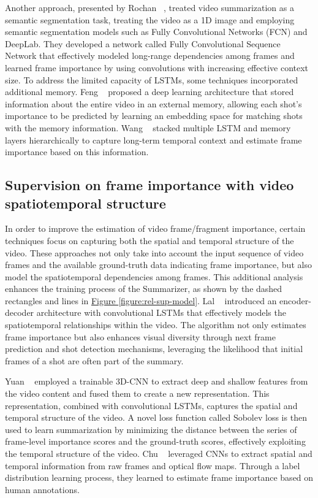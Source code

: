 		Another approach, presented by Rochan \etal~\cite{rochan2018sequence}, treated video summarization as a semantic segmentation task, treating the video as a 1D image and employing semantic segmentation models such as Fully Convolutional Networks (FCN) and DeepLab. They developed a network called Fully Convolutional Sequence Network that effectively modeled long-range dependencies among frames and learned frame importance by using convolutions with increasing effective context size. To address the limited capacity of LSTMs, some techniques incorporated additional memory. Feng \etal~\cite{feng2018memory} proposed a deep learning architecture that stored information about the entire video in an external memory, allowing each shot's importance to be predicted by learning an embedding space for matching shots with the memory information. Wang \etal~\cite{wang2019stacked} stacked multiple LSTM and memory layers hierarchically to capture long-term temporal context and estimate frame importance based on this information.


	\subsection{Supervision on frame importance with video spatiotemporal structure}
	\label{subsec:rel-sup-spatiotemporal}

		In order to improve the estimation of video frame/fragment importance, certain techniques focus on capturing both the spatial and temporal structure of the video. These approaches not only take into account the input sequence of video frames and the available ground-truth data indicating frame importance, but also model the spatiotemporal dependencies among frames. This additional analysis enhances the training process of the Summarizer, as shown by the dashed rectangles and lines in \hyperref[figure:rel-sup-model]{Figure \ref{figure:rel-sup-model}}. Lal \etal~\cite{lal2019online} introduced an encoder-decoder architecture with convolutional LSTMs that effectively models the spatiotemporal relationships within the video. The algorithm not only estimates frame importance but also enhances visual diversity through next frame prediction and shot detection mechanisms, leveraging the likelihood that initial frames of a shot are often part of the summary.
		
		Yuan \etal~\cite{yuan2019spatiotemporal} employed a trainable 3D-CNN to extract deep and shallow features from the video content and fused them to create a new representation. This representation, combined with convolutional LSTMs, captures the spatial and temporal structure of the video. A novel loss function called Sobolev loss is then used to learn summarization by minimizing the distance between the series of frame-level importance scores and the ground-truth scores, effectively exploiting the temporal structure of the video. Chu \etal~\cite{chu2019spatiotemporal} leveraged CNNs to extract spatial and temporal information from raw frames and optical flow maps. Through a label distribution learning process, they learned to estimate frame importance based on human annotations.
		
